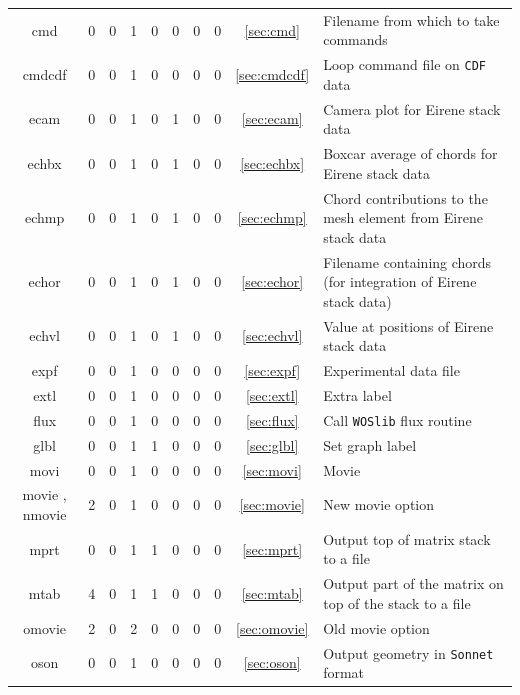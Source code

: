 \documentclass[a4paper,10pt]{report}
\begin{document}
\begin{center}
\begin{longtable}{|c|c|c|c|c|c|c|c|c|l|}
    cmd \index{b2plot, cmd}      & 0 & 0 & 1 & 0 & 0 & 0 & 0 & \ref{sec:cmd}      & Filename from which to take commands \\
    cmdcdf \index{b2plot, cmdcdf} & 0 & 0 & 1 & 0 & 0 & 0 & 0 & \ref{sec:cmdcdf}   & Loop command file on {\tt CDF} data \\
    ecam \index{b2plot, ecam}    & 0 & 0 & 1 & 0 & 1 & 0 & 0 & \ref{sec:ecam}     & Camera plot for Eirene stack data \\
    echbx \index{b2plot, echbx}  & 0 & 0 & 1 & 0 & 1 & 0 & 0 & \ref{sec:echbx}    & Boxcar average of chords for Eirene stack data \\
    echmp \index{b2plot, echmp}  & 0 & 0 & 1 & 0 & 1 & 0 & 0 & \ref{sec:echmp}    & Chord contributions to the mesh element from Eirene stack data \\
    echor \index{b2plot, echor}  & 0 & 0 & 1 & 0 & 1 & 0 & 0 & \ref{sec:echor}    & Filename containing chords (for integration of Eirene stack data) \\
    echvl \index{b2plot, echvl}  & 0 & 0 & 1 & 0 & 1 & 0 & 0 & \ref{sec:echvl}    & Value at positions of Eirene stack data \\
    expf \index{b2plot, expf}    & 0 & 0 & 1 & 0 & 0 & 0 & 0 & \ref{sec:expf}     & Experimental data file \\
    extl \index{b2plot, extl}    & 0 & 0 & 1 & 0 & 0 & 0 & 0 & \ref{sec:extl}     & Extra label \\
    flux \index{b2plot, flux}    & 0 & 0 & 1 & 0 & 0 & 0 & 0 & \ref{sec:flux}     & Call {\tt WOSlib} flux routine \\
    glbl \index{b2plot, glbl}    & 0 & 0 & 1 & 1 & 0 & 0 & 0 & \ref{sec:glbl}     & Set graph label \\
    movi \index{b2plot, movi}    & 0 & 0 & 1 & 0 & 0 & 0 & 0 & \ref{sec:movi}     & Movie \\
    movie \index{b2plot, movie}, nmovie \index{b2plot, nmovie} & 2 & 0 & 1 & 0 & 0 & 0 & 0 & \ref{sec:movie} & New movie option \\
    mprt \index{b2plot, mprt}    & 0 & 0 & 1 & 1 & 0 & 0 & 0 & \ref{sec:mprt}     & Output top of matrix stack to a file \\
    mtab \index{b2plot, mtab}    & 4 & 0 & 1 & 1 & 0 & 0 & 0 & \ref{sec:mtab}     & Output part of the matrix on top of the stack to a file \\
    omovie \index{b2plot, omovie} & 2 & 0 & 2 & 0 & 0 & 0 & 0 & \ref{sec:omovie}   & Old movie option \\
    oson \index{b2plot, oson}    & 0 & 0 & 1 & 0 & 0 & 0 & 0 & \ref{sec:oson}     & Output geometry in {\tt Sonnet} format \\

\end{longtable}
\end{center}
\end{document}
